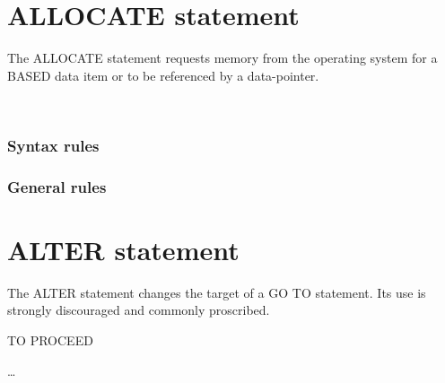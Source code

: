 \section{ALLOCATE statement}

The ALLOCATE statement requests memory from the operating system for a BASED data item or to be referenced by a data-pointer.

\begin{syntax}
  \begin{1=}
    \identifier
    \begin{0-1}
    \end{0-1} \\
    \arithmeticexpression
    \begin{0-1}
    \end{0-1}
  \end{1=}

  \begin{0-1}
     \identifier
  \end{0-1}
\end{syntax}

\subsubsection{Syntax rules}

\subsubsection{General rules}

\section{ALTER statement}

The ALTER statement changes the target of a GO TO statement. Its use is strongly discouraged and commonly proscribed.

\begin{syntax}[\deletedcolour]
    \begin{1=}
      \procedurename TO PROCEED  \procedurename
    \end{1=} \ldots
\end{syntax}

